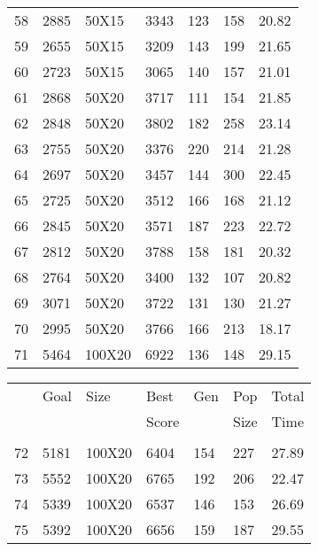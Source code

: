 \documentclass[14pt]{acmsiggraph}
\begin{document}
\begin{table}[h!]
\begin{center}
{\begin{tabular}{lllllll||}
					58  & 2885 & 50X15  & \cellcolor[rgb]{0.61,0.75,0.35}3343 & 123 & 158  & 20.82 \\
					59  & 2655 & 50X15  & \cellcolor[rgb]{0.67,0.77,0.37}3209 & 143 & 199  & 21.65 \\
					60  & 2723 & 50X15  & \cellcolor[rgb]{0.57,0.73,0.33}3065 & 140 & 157  & 21.01 \\
					61  & 2868 & 50X20  & \cellcolor[rgb]{0.76,0.81,0.41}3717 & 111 & 154  & 21.85 \\
					62  & 2848 & 50X20  & \cellcolor[rgb]{0.81,0.83,0.43}3802 & 182 & 258  & 23.14 \\
					63  & 2755 & 50X20  & \cellcolor[rgb]{0.69,0.78,0.38}3376 & 220 & 214  & 21.28 \\
					64  & 2697 & 50X20  & \cellcolor[rgb]{0.75,0.81,0.41}3457 & 144 & 300  & 22.45 \\
					65  & 2725 & 50X20  & \cellcolor[rgb]{0.76,0.81,0.41}3512 & 166 & 168  & 21.12 \\
					66  & 2845 & 50X20  & \cellcolor[rgb]{0.72,0.8,0.4}3571   & 187 & 223  & 22.72 \\
					67  & 2812 & 50X20  & \cellcolor[rgb]{0.82,0.84,0.44}3788 & 158 & 181  & 20.32 \\
					68  & 2764 & 50X20  & \cellcolor[rgb]{0.69,0.78,0.38}3400 & 132 & 107  & 20.82 \\
					69  & 3071 & 50X20  & \cellcolor[rgb]{0.67,0.78,0.37}3722 & 131 & 130  & 21.27 \\
					70  & 2995 & 50X20  & \cellcolor[rgb]{0.72,0.8,0.4}3766   & 166 & 213  & 18.17 \\
					71  & 5464 & 100X20 & \cellcolor[rgb]{0.73,0.8,0.4}6922   & 136 & 148  & 29.15 \\
				\end{tabular}\centering
			}
			\subtable
			{
				\begin{tabular}{||lllllll}
					 & Goal   & Size   & Best & Gen & Pop & Total \\ 
					 &  &    & Score &   &  Size & Time \\ \hline \\
					72  & 5181 & 100X20 & \cellcolor[rgb]{0.7,0.79,0.38}6404  & 154 & 227  & 27.89 \\
					73  & 5552 & 100X20 & \cellcolor[rgb]{0.68,0.78,0.38}6765 & 192 & 206  & 22.47 \\
					74  & 5339 & 100X20 & \cellcolor[rgb]{0.69,0.78,0.38}6537 & 146 & 153  & 26.69 \\
					75  & 5392 & 100X20 & \cellcolor[rgb]{0.7,0.79,0.38}6656  & 159 & 187  & 29.55 \\

\end{tabular}}
\end{center}
\end{table}
\end{document}
